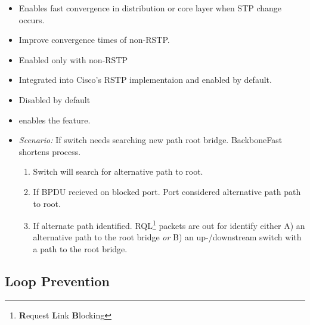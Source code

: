 \begin{itemize}
\begin{itemize}
        \item Enables fast convergence in distribution or core layer when STP change occurs.
        \item Improve convergence times of non-RSTP.
        \item Enabled only with non-RSTP
        \item Integrated into Cisco's RSTP implementaion and enabled by default.
        \item Disabled by default
        \item {} enables the feature.
        \item \textit{Scenario:} If switch needs searching new path root bridge. BackboneFast shortens process.
        \begin{enumerate}
            \item Switch will search for alternative path to root.
            \item If BPDU recieved on blocked port. Port considered alternative path path to root.
            \item If alternate path identified. RQL\footnote{\textbf{R}equest \textbf{L}ink \textbf{B}locking} packets are out for identify either A) an alternative path to the root bridge \textit{or} B) an up-/downstream switch with a path to the root bridge.
        \end{enumerate}
    \end{itemize}
\end{itemize}

\subsection{Loop Prevention}

